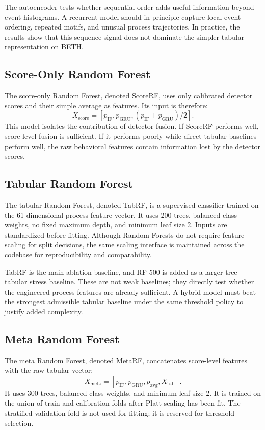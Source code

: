 \documentclass[10pt,journal,compsoc]{IEEEtran}
\begin{document}
The autoencoder tests whether sequential order adds useful information beyond event histograms. A recurrent model should in principle capture local event ordering, repeated motifs, and unusual process trajectories. In practice, the results show that this sequence signal does not dominate the simpler tabular representation on BETH.

\subsection{Score-Only Random Forest}

The score-only Random Forest, denoted ScoreRF, uses only calibrated detector scores and their simple average as features. Its input is therefore:
\[
X_{\text{score}} = [p_{\text{IF}}, p_{\text{GRU}}, (p_{\text{IF}} + p_{\text{GRU}})/2].
\]
This model isolates the contribution of detector fusion. If ScoreRF performs well, score-level fusion is sufficient. If it performs poorly while direct tabular baselines perform well, the raw behavioral features contain information lost by the detector scores.

\subsection{Tabular Random Forest}

The tabular Random Forest, denoted TabRF, is a supervised classifier trained on the 61-dimensional process feature vector. It uses 200 trees, balanced class weights, no fixed maximum depth, and minimum leaf size 2. Inputs are standardized before fitting. Although Random Forests do not require feature scaling for split decisions, the same scaling interface is maintained across the codebase for reproducibility and comparability.

TabRF is the main ablation baseline, and RF-500 is added as a larger-tree tabular stress baseline. These are not weak baselines; they directly test whether the engineered process features are already sufficient. A hybrid model must beat the strongest admissible tabular baseline under the same threshold policy to justify added complexity.

\subsection{Meta Random Forest}

The meta Random Forest, denoted MetaRF, concatenates score-level features with the raw tabular vector:
\[
X_{\text{meta}} = [p_{\text{IF}}, p_{\text{GRU}}, p_{\text{avg}}, X_{\text{tab}}].
\]
It uses 300 trees, balanced class weights, and minimum leaf size 2. It is trained on the union of train and calibration folds after Platt scaling has been fit. The stratified validation fold is not used for fitting; it is reserved for threshold selection.
\end{document}
